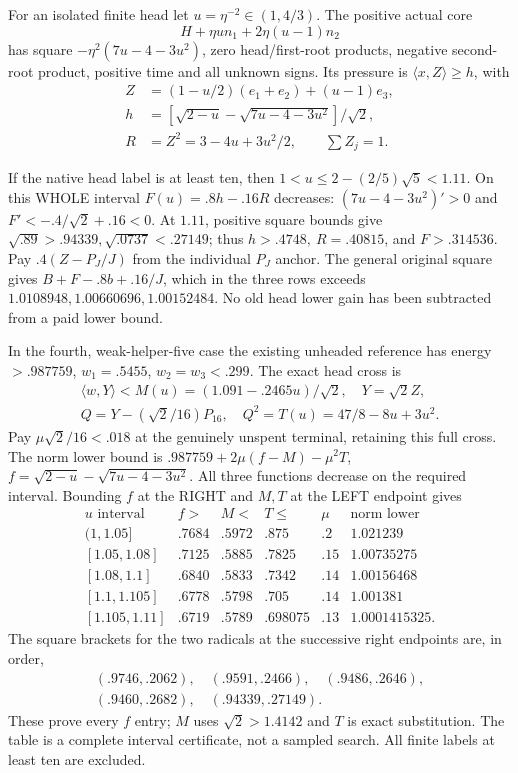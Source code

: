 \documentclass[11pt]{article}
\theoremstyle{definition}
\theoremstyle{remark}
\newcommand{\ip}[2]{\langle #1,#2\rangle}
\begin{document}
For an isolated finite head let \(u=\eta^{-2}\in(1,4/3)\).
The positive actual core
\[
 H+\eta u n_1+2\eta(u-1)n_2
\]
has square \(-\eta^2(7u-4-3u^2)\), zero head/first-root products,
negative second-root product, positive time and all unknown signs.
Its pressure is \(\ip xZ\geq h\), with
\[
\begin{aligned}
 Z&=(1-u/2)(e_1+e_2)+(u-1)e_3,\\
 h&=[\sqrt{2-u}-\sqrt{7u-4-3u^2}]/\sqrt2,\\
 R&=Z^2=3-4u+3u^2/2,\qquad \sum Z_j=1 .
\end{aligned}
\]

If the native head label is at least ten, then
\(1<u\leq2-(2/5)\sqrt5<1.11\).
On this WHOLE interval \(F(u)=.8h-.16R\) decreases:
\((7u-4-3u^2)'>0\) and
\(F'<-.4/\sqrt2+.16<0\).
At \(1.11\), positive square bounds give
\(\sqrt{.89}>.94339,\sqrt{.0737}<.27149\);
thus \(h>.4748,\ R=.40815\), and \(F>.314536\).
Pay \(.4(Z-P_J/J)\) from the individual \(P_J\) anchor.
The general original square gives \(B+F-.8b+.16/J\),
which in the three rows exceeds
\(1.0108948,1.00660696,1.00152484\).
No old head lower gain has been subtracted from a paid lower bound.

In the fourth, weak-helper-five case the existing unheaded reference
has energy \(>.987759\), \(w_1=.5455\), \(w_2=w_3<.299\).
The exact head cross is
\[
\begin{gathered}
 \ip wY< M(u)=(1.091-.2465u)/\sqrt2,\quad Y=\sqrt2Z,\\
 Q=Y-(\sqrt2/16)P_{16},\quad Q^2=T(u)=47/8-8u+3u^2 .
\end{gathered}
\]
Pay \(\mu\sqrt2/16<.018\) at the genuinely unspent terminal,
retaining this full cross. The norm lower bound is
\(.987759+2\mu(f-M)-\mu^2T\), \(f=\sqrt{2-u}-\sqrt{7u-4-3u^2}\).
All three functions decrease on the required interval.
Bounding \(f\) at the RIGHT and \(M,T\) at the LEFT endpoint gives
\[
\begin{array}{c|c|c|c|c|c}
u\text{ interval}&f>&M<&T\leq&\mu&\text{norm lower}\\ \hline
(1,1.05]&.7684&.5972&.875&.2&1.021239\\
{}[1.05,1.08]&.7125&.5885&.7825&.15&1.00735275\\
{}[1.08,1.1]&.6840&.5833&.7342&.14&1.00156468\\
{}[1.1,1.105]&.6778&.5798&.705&.14&1.001381\\
{}[1.105,1.11]&.6719&.5789&.698075&.13&1.0001415325 .
\end{array}
\]
The square brackets for the two radicals at the successive right
endpoints are, in order,
\[
\begin{gathered}
(.9746,.2062),\quad(.9591,.2466),\quad(.9486,.2646),\\
(.9460,.2682),\quad(.94339,.27149).
\end{gathered}
\]
These prove every \(f\) entry; \(M\) uses \(\sqrt2>1.4142\)
and \(T\) is exact substitution.
The table is a complete interval certificate, not a sampled search.
All finite labels at least ten are excluded.
\end{document}

